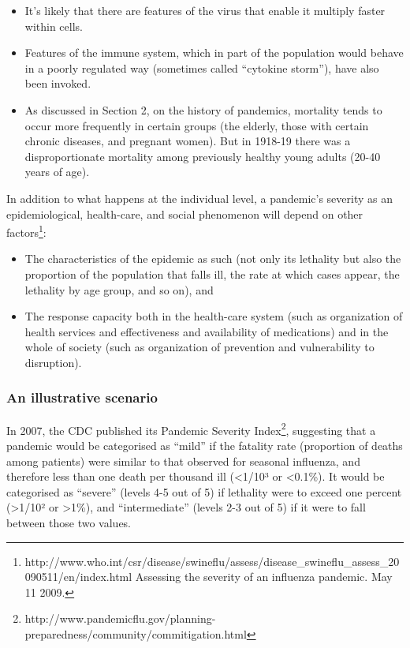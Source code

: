 \documentclass[12pt, a4]{scrartcl}
\begin{document}
\begin{itemize}
	\item It's likely that there are features of the virus that enable it multiply faster within cells.
	\item Features of the immune system, which in part of the population would behave in a poorly regulated way (sometimes called “cytokine storm”), have also been invoked.
	\item As discussed in Section 2, on the history of pandemics, mortality tends to occur more frequently in certain groups (the elderly, those with certain chronic diseases, and pregnant women). But in 1918-19 there was a disproportionate mortality among previously healthy young adults (20-40 years of age).
\end{itemize}

In addition to what happens at the individual level, a pandemic’s severity as an epidemiological, health-care, and social phenomenon will depend on other factors\footnote{http://www.who.int/csr/disease/swineflu/assess/disease_swineflu_assess_20090511/en/index.html Assessing the severity of an influenza pandemic. May 11 2009.}:

\begin{itemize}
	\item The characteristics of the epidemic as such (not only its lethality but also the proportion of the population that falls ill, the rate at which cases appear, the lethality by age group, and so on), and 
	\item The response capacity both in the health-care system (such as organization of health services and effectiveness and availability of medications) and in the whole of society (such as organization of prevention and vulnerability to disruption).
\end{itemize}

\subsubsection {An illustrative scenario}
In 2007, the CDC published its Pandemic Severity Index\footnote{http://www.pandemicflu.gov/planning-preparedness/community/commitigation.html}, suggesting that a pandemic would be categorised as “mild” if the fatality rate (proportion of deaths among patients) were similar to that observed for seasonal influenza, and therefore less than one death per thousand ill (<1/10³ or <0.1\%). It would be categorised as “severe” (levels 4-5 out of 5) if lethality were to exceed one percent (>1/10² or >1\%), and “intermediate” (levels 2-3 out of 5) if it were to fall between those two values.
\end{document}
